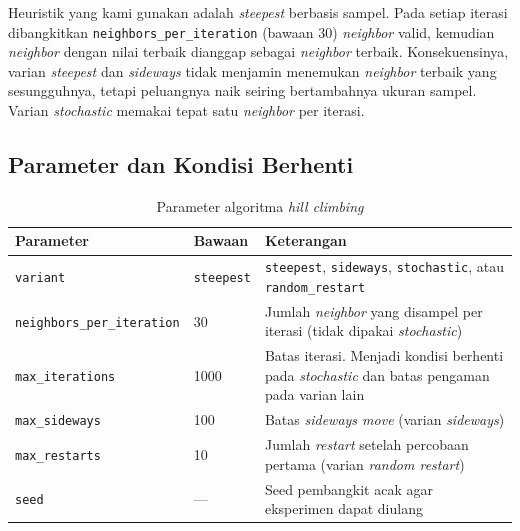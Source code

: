 Heuristik yang kami gunakan adalah \textit{steepest} berbasis sampel. Pada setiap iterasi dibangkitkan \texttt{neighbors\_per\_iteration} (bawaan 30) \textit{neighbor} valid, kemudian \textit{neighbor} dengan nilai terbaik dianggap sebagai \textit{neighbor} terbaik. Konsekuensinya, varian \textit{steepest} dan \textit{sideways} tidak menjamin menemukan \textit{neighbor} terbaik yang sesungguhnya, tetapi peluangnya naik seiring bertambahnya ukuran sampel. Varian \textit{stochastic} memakai tepat satu \textit{neighbor} per iterasi.

\subsection{Parameter dan Kondisi Berhenti}
\begin{table}[h]
    \centering
    \begin{tabular}{@{}p{4.7cm}p{2.3cm}p{6.5cm}@{}}
        \toprule
        Parameter                          & Bawaan            & Keterangan                                                                                           \\
        \midrule
        \texttt{variant}                   & \texttt{steepest} & \texttt{steepest}, \texttt{sideways}, \texttt{stochastic}, atau \texttt{random\_restart}             \\
        \texttt{neighbors\_per\_iteration} & 30                & Jumlah \textit{neighbor} yang disampel per iterasi (tidak dipakai \textit{stochastic})               \\
        \texttt{max\_iterations}           & 1000              & Batas iterasi. Menjadi kondisi berhenti pada \textit{stochastic} dan batas pengaman pada varian lain \\
        \texttt{max\_sideways}             & 100               & Batas \textit{sideways move} (varian \textit{sideways})                                              \\
        \texttt{max\_restarts}             & 10                & Jumlah \textit{restart} setelah percobaan pertama (varian \textit{random restart})                   \\
        \texttt{seed}                      & ---               & Seed pembangkit acak agar eksperimen dapat diulang                                                   \\
        \bottomrule
    \end{tabular}
    \caption{Parameter algoritma \textit{hill climbing}}
\end{table}

